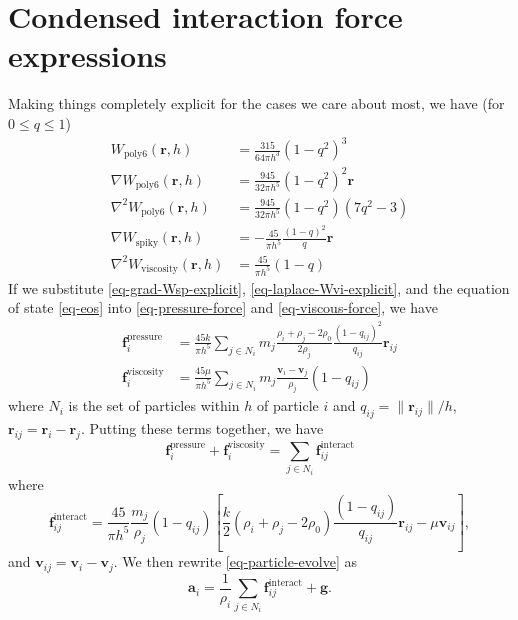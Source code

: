 \documentclass[10pt, leqno]{article} %
\newcommand{\bfr}{\mathbf{r}}
\newcommand{\bfv}{\mathbf{v}}
\newcommand{\bfa}{\mathbf{a}}
\newcommand{\bff}{\mathbf{f}}
\newcommand{\bfg}{\mathbf{g}}
\newcommand{\Wps}{W_{\mathrm{poly6}}}
\newcommand{\Wsp}{W_{\mathrm{spiky}}}
\newcommand{\Wvi}{W_{\mathrm{viscosity}}}
\begin{document}
\section{Condensed interaction force expressions}

Making things completely explicit for the cases we care about most, 
we have (for $0 \leq q \leq 1$)
\begin{align}
  \Wps(\bfr, h) 
    &= \frac{315}{64 \pi h^{3}} (1-q^2)^3 
    \label{eq-Wps-explicit} \\
  \nabla \Wps(\bfr, h) 
    &= \frac{945}{32 \pi h^{5}} (1-q^2)^2 \bfr
    \label{eq-grad-Wps-explicit} \\
  \nabla^2 \Wps(\bfr, h) 
    &= \frac{945}{32 \pi h^{5}} (1-q^2)(7q^2-3) 
    \label{eq-laplace-Wps-explicit} \\
  \nabla \Wsp(\bfr, h) 
    &= -\frac{45}{\pi h^5} \frac{(1-q)^2}{q} \bfr
    \label{eq-grad-Wsp-explicit} \\
  \nabla^2 \Wvi(\bfr, h)
    &= \frac{45}{\pi h^5} (1-q)
   \label{eq-laplace-Wvi-explicit}
\end{align}
If we substitute \eqref{eq-grad-Wsp-explicit}, \eqref{eq-laplace-Wvi-explicit},
and the equation of state \eqref{eq-eos} into 
\eqref{eq-pressure-force} and \eqref{eq-viscous-force}, we have
\begin{align*}
  \bff_i^{\mathrm{pressure}}  &= 
    \frac{45k}{\pi h^5} \sum_{j \in N_i} m_j 
    \frac{\rho_i+\rho_j-2\rho_0}{2\rho_j} \frac{(1-q_{ij})^2}{q_{ij}} \bfr_{ij} \\
  \bff_i^{\mathrm{viscosity}} &=
    \frac{45 \mu}{\pi h^5} \sum_{j \in N_i} m_j 
    \frac{\bfv_i-\bfv_j}{\rho_j} (1-q_{ij})
\end{align*}
where $N_i$ is the set of particles within $h$ of particle $i$ and
$q_{ij} = \|\bfr_{ij}\|/h$, $\bfr_{ij} = \bfr_i-\bfr_j$.
Putting these terms together, we have
\[
  \bff_i^{\mathrm{pressure}} + \bff_i^{\mathrm{viscosity}} =
    \sum_{j \in N_i} \bff_{ij}^{\mathrm{interact}}
\]
where
\[
  \bff_{ij}^{\mathrm{interact}} =
  \frac{45}{\pi h^5} \frac{m_j}{\rho_j} (1-q_{ij}) \left[
    \frac{k}{2} (\rho_i + \rho_j - 2 \rho_0) \frac{(1-q_{ij})}{q_{ij}} \bfr_{ij} -
    \mu \bfv_{ij}
  \right],
\]
and $\bfv_{ij} = \bfv_i - \bfv_j$.  We then rewrite \eqref{eq-particle-evolve}
as
\[
  \bfa_i = \frac{1}{\rho_i} \sum_{j \in N_i} \bff_{ij}^{\mathrm{interact}} + \bfg.
\]


\end{document}
